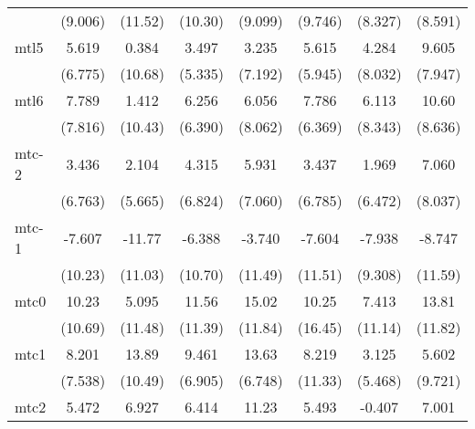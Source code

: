 \documentclass{article}
\begin{document}
{\begin{longtable}{l*{7}{c}}
                &  (9.006)         &  (11.52)         &  (10.30)         &  (9.099)         &  (9.746)         &  (8.327)         &  (8.591)         \\
mtl5            &    5.619         &    0.384         &    3.497         &    3.235         &    5.615         &    4.284         &    9.605         \\
                &  (6.775)         &  (10.68)         &  (5.335)         &  (7.192)         &  (5.945)         &  (8.032)         &  (7.947)         \\
mtl6            &    7.789         &    1.412         &    6.256         &    6.056         &    7.786         &    6.113         &    10.60         \\
                &  (7.816)         &  (10.43)         &  (6.390)         &  (8.062)         &  (6.369)         &  (8.343)         &  (8.636)         \\
mtc-2           &    3.436         &    2.104         &    4.315         &    5.931         &    3.437         &    1.969         &    7.060         \\
                &  (6.763)         &  (5.665)         &  (6.824)         &  (7.060)         &  (6.785)         &  (6.472)         &  (8.037)         \\
mtc-1           &   -7.607         &   -11.77         &   -6.388         &   -3.740         &   -7.604         &   -7.938         &   -8.747         \\
                &  (10.23)         &  (11.03)         &  (10.70)         &  (11.49)         &  (11.51)         &  (9.308)         &  (11.59)         \\
mtc0            &    10.23         &    5.095         &    11.56         &    15.02         &    10.25         &    7.413         &    13.81         \\
                &  (10.69)         &  (11.48)         &  (11.39)         &  (11.84)         &  (16.45)         &  (11.14)         &  (11.82)         \\
mtc1            &    8.201         &    13.89         &    9.461         &    13.63         &    8.219         &    3.125         &    5.602         \\
                &  (7.538)         &  (10.49)         &  (6.905)         &  (6.748)         &  (11.33)         &  (5.468)         &  (9.721)         \\
mtc2            &    5.472         &    6.927         &    6.414         &    11.23         &    5.493         &   -0.407         &    7.001         \\

\end{longtable}}
\end{document}
